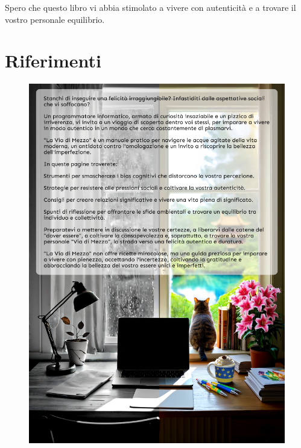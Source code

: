 \documentclass[12pt]{book} %
\begin{document}
Spero che questo libro vi abbia stimolato a vivere con autenticità e a trovare il vostro personale equilibrio.

\clearpage\section{Riferimenti}
\theendnotes

\clearpage
{}

\begin{figure}[htbp]
    \centering
    \includegraphics[width=\paperwidth,height=\paperheight]{images/cover_back.png}
    \vspace{-\baselineskip} %
\end{figure}
\end{document}
